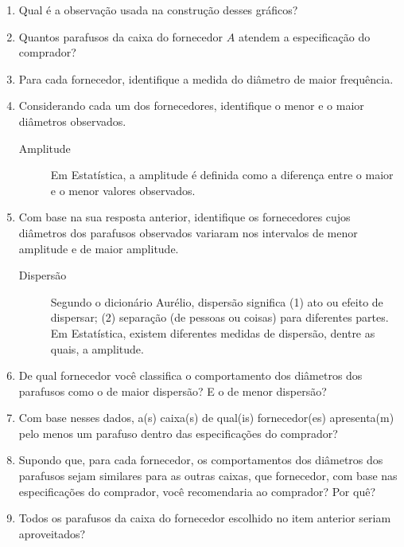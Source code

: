 \documentclass[10 pt,usenames,dvipsnames, oneside]{article}
\begin{document}
\begin{enumerate}
\item {} 
Qual é a observação usada na construção desses gráficos?

\item {} 
Quantos parafusos da caixa do fornecedor $A$ atendem a especificação do comprador?

\item {} 
Para cada fornecedor, identifique a medida do diâmetro de maior frequência.

\item {} 
Considerando cada um dos fornecedores, identifique o menor e o maior diâmetros observados.

\begin{description}
\item[{Amplitude}] \leavevmode{}\label{est1-def-2}
Em Estatística, a amplitude é definida como a diferença entre o maior e o menor valores observados.
\end{description}

\item {} 
Com base na sua resposta anterior, identifique os fornecedores cujos diâmetros dos parafusos observados variaram nos intervalos de menor amplitude e de maior amplitude.

\begin{description}

\item[{Dispersão}] \leavevmode{}\label{est1-def-3}
Segundo o dicionário Aurélio, dispersão significa (1) ato ou efeito de dispersar; (2) separação (de pessoas ou coisas) para diferentes partes.  Em Estatística, existem diferentes medidas de dispersão, dentre as quais, a amplitude.

\end{description}

\item De qual fornecedor você classifica o comportamento dos diâmetros dos parafusos como o de maior dispersão? E o de menor dispersão?


\item Com base nesses dados, a(s) caixa(s) de qual(is)  fornecedor(es) apresenta(m) pelo menos um parafuso dentro das especificações do comprador?

\item Supondo que, para cada fornecedor, os comportamentos dos diâmetros dos parafusos sejam similares para as outras caixas, que fornecedor, com base nas especificações do comprador, você recomendaria ao comprador? Por quê?

\item Todos os parafusos da caixa do fornecedor escolhido no item anterior seriam aproveitados?
\end{enumerate}
\end{document}
